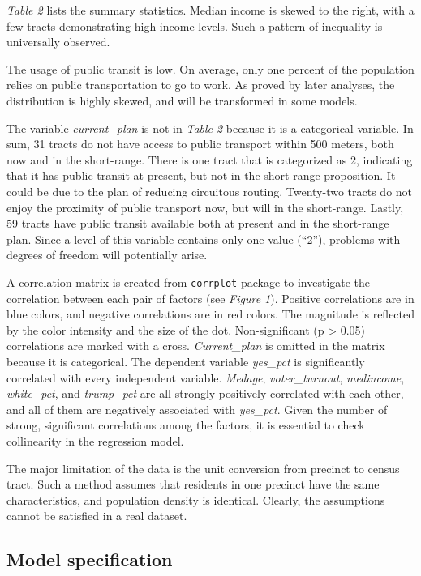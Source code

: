 \documentclass[
]{article}
\begin{document}
\emph{Table 2} lists the summary statistics. Median income is skewed to
the right, with a few tracts demonstrating high income levels. Such a
pattern of inequality is universally observed.

The usage of public transit is low. On average, only one percent of the
population relies on public transportation to go to work. As proved by
later analyses, the distribution is highly skewed, and will be
transformed in some models.

The variable \emph{current\_plan} is not in \emph{Table 2} because it is
a categorical variable. In sum, 31 tracts do not have access to public
transport within 500 meters, both now and in the short-range. There is
one tract that is categorized as 2, indicating that it has public
transit at present, but not in the short-range proposition. It could be
due to the plan of reducing circuitous routing. Twenty-two tracts do not
enjoy the proximity of public transport now, but will in the
short-range. Lastly, 59 tracts have public transit available both at
present and in the short-range plan. Since a level of this variable
contains only one value (``2''), problems with degrees of freedom will
potentially arise.

A correlation matrix is created from \texttt{corrplot} package to
investigate the correlation between each pair of factors (see
\emph{Figure 1}). Positive correlations are in blue colors, and negative
correlations are in red colors. The magnitude is reflected by the color
intensity and the size of the dot. Non-significant (p \textgreater{}
0.05) correlations are marked with a cross. \emph{Current\_plan} is
omitted in the matrix because it is categorical. The dependent variable
\emph{yes\_pct} is significantly correlated with every independent
variable. \emph{Medage}, \emph{voter\_turnout}, \emph{medincome},
\emph{white\_pct}, and \emph{trump\_pct} are all strongly positively
correlated with each other, and all of them are negatively associated
with \emph{yes\_pct}. Given the number of strong, significant
correlations among the factors, it is essential to check collinearity in
the regression model.

The major limitation of the data is the unit conversion from precinct to
census tract. Such a method assumes that residents in one precinct have
the same characteristics, and population density is identical. Clearly,
the assumptions cannot be satisfied in a real dataset.

\hypertarget{model-specification}{%
\subsection{Model specification}\label{model-specification}}
\end{document}
